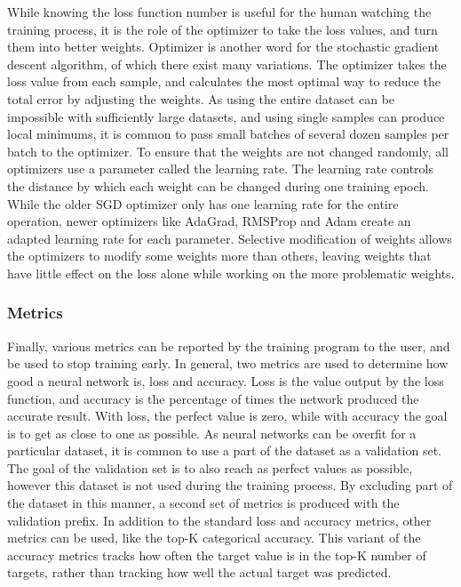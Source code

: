 While knowing the loss function number is useful for the human watching the training process, it is the role of the optimizer to take the loss values, and turn them into better weights.
Optimizer is another word for the stochastic gradient descent algorithm\cite{wiki:sgd}, of which there exist many variations.
The optimizer takes the loss value from each sample, and calculates the most optimal way to reduce the total error by adjusting the weights.
As using the entire dataset can be impossible with sufficiently large datasets, and using single samples can produce local minimums, it is common to pass small batches of several dozen samples per batch to the optimizer.
To ensure that the weights are not changed randomly, all optimizers use a parameter called the learning rate.
The learning rate controls the distance by which each weight can be changed during one training epoch.
While the older SGD optimizer only has one learning rate for the entire operation, newer optimizers like AdaGrad, RMSProp and Adam create an adapted learning rate for each parameter. 
Selective modification of weights allows the optimizers to modify some weights more than others, leaving weights that have little effect on the loss alone while working on the more problematic weights.

\subsubsection{Metrics}
Finally, various metrics can be reported by the training program to the user, and be used to stop training early.
In general, two metrics are used to determine how good a neural network is, loss and accuracy.
Loss is the value output by the loss function, and accuracy is the percentage of times the network produced the accurate result.
With loss, the perfect value is zero, while with accuracy the goal is to get as close to one as possible.
As neural networks can be overfit for a particular dataset, it is common to use a part of the dataset as a validation set.
The goal of the validation set is to also reach as perfect values as possible, however this dataset is not used during the training process.
By excluding part of the dataset in this manner, a second set of metrics is produced with the validation prefix.
In addition to the standard loss and accuracy metrics, other metrics can be used, like the top-K categorical accuracy.
This variant of the accuracy metrics tracks how often the target value is in the top-K number of targets, rather than tracking how well the actual target was predicted.



